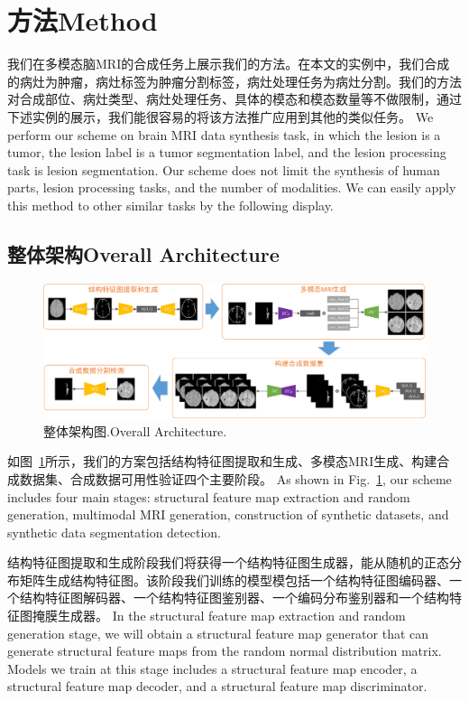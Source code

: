 \documentclass[letterpaper]{article} %
\begin{document}
\section{方法Method}
\label{method}
我们在多模态脑MRI的合成任务上展示我们的方法。在本文的实例中，我们合成的病灶为肿瘤，病灶标签为肿瘤分割标签，病灶处理任务为病灶分割。我们的方法对合成部位、病灶类型、病灶处理任务、具体的模态和模态数量等不做限制，通过下述实例的展示，我们能很容易的将该方法推广应用到其他的类似任务。
We perform our scheme on brain MRI data synthesis task, in which the lesion is a tumor, the lesion label is a tumor segmentation label, and the lesion processing task is lesion segmentation. Our scheme does not limit the synthesis of human parts, lesion processing tasks, and the number of modalities. We can easily apply this method to other similar tasks by the following display.
\subsection{整体架构Overall Architecture}
\begin{figure}[t]
	\centering
	\includegraphics[width=0.98\columnwidth]{figures/architecture}
	\caption{整体架构图.Overall Architecture.}
	\label{architecture}
\end{figure}
如图~\ref{architecture}所示，我们的方案包括结构特征图提取和生成、多模态MRI生成、构建合成数据集、合成数据可用性验证四个主要阶段。
As shown in Fig.~\ref{architecture}, our scheme includes four main stages: structural feature map extraction and random generation, multimodal MRI generation, construction of synthetic datasets, and synthetic data segmentation detection.

结构特征图提取和生成阶段我们将获得一个结构特征图生成器，能从随机的正态分布矩阵生成结构特征图。该阶段我们训练的模型模包括一个结构特征图编码器、一个结构特征图解码器、一个结构特征图鉴别器、一个编码分布鉴别器和一个结构特征图掩膜生成器。
In the structural feature map extraction and random generation stage, we will obtain a structural feature map generator that can generate structural feature maps from the random normal distribution matrix. Models we train at this stage includes a structural feature map encoder, a structural feature map decoder, and a structural feature map discriminator.
\end{document}
